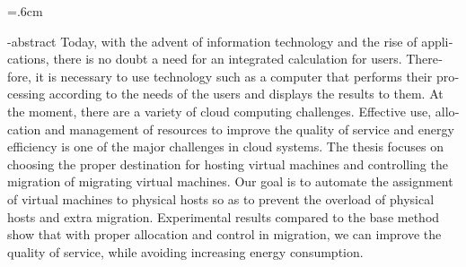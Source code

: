 
\baselineskip=.6cm
\begin{latin}
\en-abstract
{Today, with the advent of information technology and the rise of applications, there is no doubt a need for an integrated calculation for users. Therefore, it is necessary to use technology such as a computer that performs their processing according to the needs of the users and displays the results to them. At the moment, there are a variety of cloud computing challenges. Effective use, allocation and management of resources to improve the quality of service and energy efficiency is one of the major challenges in cloud systems. The thesis focuses on choosing the proper destination for hosting virtual machines and controlling the migration of migrating virtual machines. Our goal is to automate the assignment of virtual machines to physical hosts so as to prevent the overload of physical hosts and extra migration. Experimental results compared to the base method show that with proper allocation and control in migration, we can improve the quality of service, while avoiding increasing energy consumption.
}
\latinfirstPage
\end{latin}
